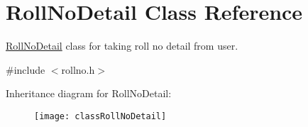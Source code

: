 \hypertarget{classRollNoDetail}{\section{\-Roll\-No\-Detail \-Class \-Reference}
\label{classRollNoDetail}
}


\hyperlink{classRollNoDetail}{\-Roll\-No\-Detail} class for taking roll no detail from user.  




{\ttfamily \#include $<$rollno.\-h$>$}

\-Inheritance diagram for \-Roll\-No\-Detail\-:\begin{figure}[H]
\begin{center}
\leavevmode
\texttt{[image: classRollNoDetail]}
\end{center}
\end{figure}
